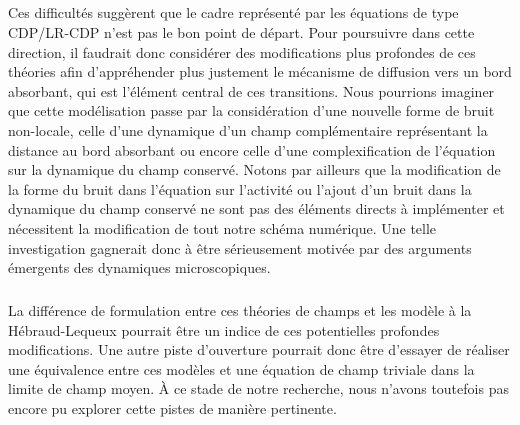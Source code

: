 \subparagraph{}Ces difficultés suggèrent que le cadre représenté par les équations de type CDP/LR-CDP n'est pas le bon point de départ. Pour poursuivre dans cette direction, il faudrait donc considérer des modifications plus profondes de ces théories afin d'appréhender plus justement le mécanisme de diffusion vers un bord absorbant, qui est l'élément central de ces transitions. Nous pourrions imaginer que cette modélisation passe par la considération d'une nouvelle forme de bruit non-locale, celle d'une dynamique d'un champ complémentaire représentant la distance au bord absorbant ou encore celle d'une complexification de l'équation sur la dynamique du champ conservé. Notons par ailleurs que la modification de la forme du bruit dans l'équation sur l'activité ou l'ajout d'un bruit dans la dynamique du champ conservé ne sont pas des éléments directs à implémenter et nécessitent la modification de tout notre schéma numérique. Une telle investigation gagnerait donc à être sérieusement motivée par des arguments émergents des dynamiques microscopiques.

\subparagraph{}La différence de formulation entre ces théories de champs et les modèle à la Hébraud-Lequeux pourrait être un indice de ces potentielles profondes modifications. Une autre piste d'ouverture pourrait donc être d'essayer de réaliser une équivalence entre ces modèles et une équation de champ triviale dans la limite de champ moyen. \`A ce stade de notre recherche, nous n'avons toutefois pas encore pu explorer cette pistes de manière pertinente.

